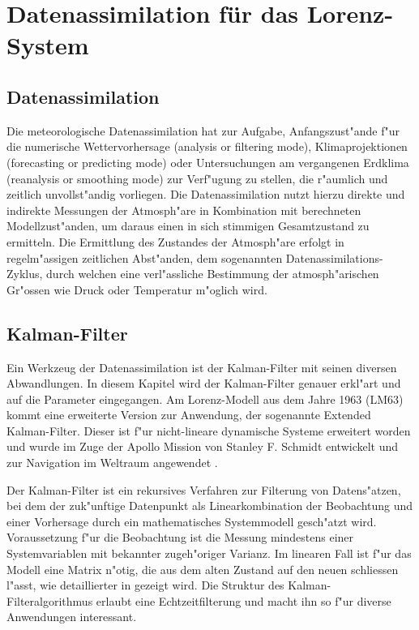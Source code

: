 %
%
%
\chapter{Datenassimilation für das Lorenz-System\label{chapter:kalman}}
\begin{refsection}

\section{Datenassimilation}
Die meteorologische Datenassimilation hat zur Aufgabe, Anfangszust"ande f"ur die numerische Wettervorhersage (analysis or filtering mode), Klimaprojektionen (forecasting or predicting mode) oder Untersuchungen am vergangenen Erdklima (reanalysis or smoothing mode) zur Verf"ugung zu stellen, die r"aumlich und zeitlich unvollst"andig vorliegen. Die Datenassimilation nutzt hierzu direkte und indirekte Messungen der Atmosph"are in Kombination mit berechneten Modellzust"anden, um daraus einen in sich stimmigen Gesamtzustand zu ermitteln. Die Ermittlung des Zustandes der Atmosph"are erfolgt in regelm"assigen zeitlichen Abst"anden, dem sogenannten Datenassimilations-Zyklus, durch welchen eine verl"assliche Bestimmung der atmosph"arischen Gr"ossen wie Druck oder Temperatur m"oglich wird.
%
%
%
%
%

\section{Kalman-Filter}
Ein Werkzeug der Datenassimilation ist der Kalman-Filter mit seinen diversen Abwandlungen. In diesem Kapitel wird der Kalman-Filter genauer erkl"art und auf die Parameter eingegangen. Am Lorenz-Modell aus dem Jahre 1963 (LM63) kommt eine erweiterte Version zur Anwendung, der sogenannte Extended Kalman-Filter. Dieser ist f"ur nicht-lineare dynamische Systeme erweitert worden und wurde im Zuge der Apollo Mission von Stanley F. Schmidt entwickelt und zur Navigation im Weltraum angewendet \cite{skript:NASAKalman}.
%
%

Der Kalman-Filter ist ein rekursives Verfahren zur Filterung von
Datens"atzen, bei dem  der zuk"unftige Datenpunkt als Linearkombination
der Beobachtung und einer Vorhersage durch ein mathematisches
Systemmodell gesch"atzt wird. Voraussetzung f"ur die Beobachtung
ist die Messung mindestens einer Systemvariablen mit bekannter zugeh"origer
Varianz. Im linearen Fall ist f"ur das Modell eine Matrix n"otig,
die aus dem alten Zustand auf den neuen schliessen l"asst, wie
detaillierter in \cite{skript:WRStat} gezeigt wird. Die Struktur
des Kalman-Filteralgorithmus erlaubt eine Echtzeitfilterung und
macht ihn so f"ur diverse Anwendungen interessant.


\end{refsection}
